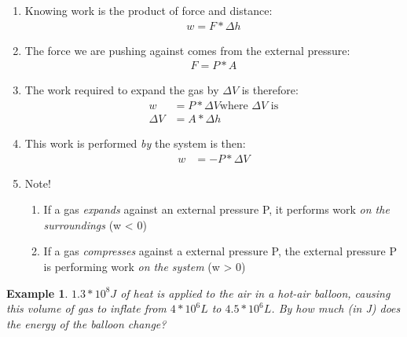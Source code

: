 \documentclass{article}  %
\newtheorem{exmp}{Example}
\begin{document}
\begin{enumerate}
    \item Knowing work is the product of force and distance:
        \begin{equation*}
            \begin{aligned}
                w = F * \Delta h
            \end{aligned}
        \end{equation*}
    \item The force we are pushing against comes from the external pressure:
        \begin{equation*}
            \begin{aligned}
                F = P * A
            \end{aligned}
        \end{equation*}
    \item The work required to expand the gas by $\Delta V$ is therefore:
        \begin{equation*}
            \begin{aligned}
                w &= P * \Delta V \text{where $\Delta V$ is}\\
                \Delta V &= A * \Delta h
            \end{aligned}
        \end{equation*}
    \item This work is performed \emph{by} the system is then:
        \begin{equation*}
            \begin{aligned}
                w &= -P * \Delta V
            \end{aligned}
        \end{equation*}
    \item Note! 
        \begin{enumerate}
            \item If a gas \emph{expands} against an external pressure P, it performs work \emph{on the surroundings} (w < 0)
            \item If a gas \emph{compresses} against a external pressure P, the external pressure P is performing work \emph{on the system} (w > 0)
        \end{enumerate}
\end{enumerate}
\begin{exmp}
    $1.3*10^8 J$ of heat is applied to the air in a hot-air balloon, causing this volume of gas to inflate from $4*10^6L$ to $4.5*10^6L$. By how much (in J) does the energy of the balloon change?
\end{exmp}
\end{document}
